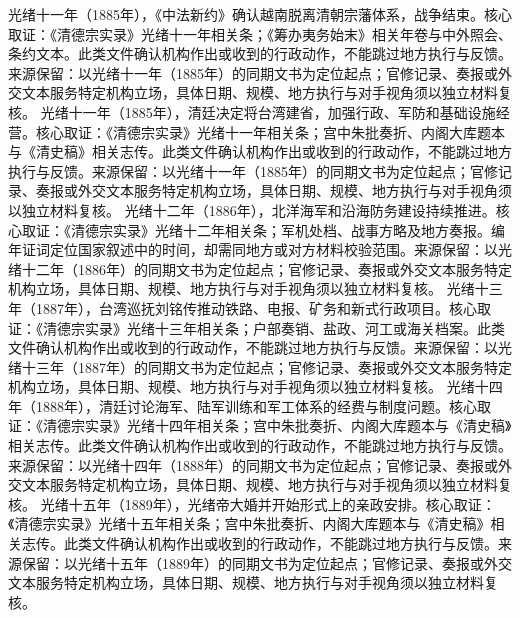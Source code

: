 光绪十一年（1885年），《中法新约》确认越南脱离清朝宗藩体系，战争结束。核心取证：《清德宗实录》光绪十一年相关条；《筹办夷务始末》相关年卷与中外照会、条约文本。此类文件确认机构作出或收到的行政动作，不能跳过地方执行与反馈。来源保留：以光绪十一年（1885年）的同期文书为定位起点；官修记录、奏报或外交文本服务特定机构立场，具体日期、规模、地方执行与对手视角须以独立材料复核。
光绪十一年（1885年），清廷决定将台湾建省，加强行政、军防和基础设施经营。核心取证：《清德宗实录》光绪十一年相关条；宫中朱批奏折、内阁大库题本与《清史稿》相关志传。此类文件确认机构作出或收到的行政动作，不能跳过地方执行与反馈。来源保留：以光绪十一年（1885年）的同期文书为定位起点；官修记录、奏报或外交文本服务特定机构立场，具体日期、规模、地方执行与对手视角须以独立材料复核。
光绪十二年（1886年），北洋海军和沿海防务建设持续推进。核心取证：《清德宗实录》光绪十二年相关条；军机处档、战事方略及地方奏报。编年证词定位国家叙述中的时间，却需同地方或对方材料校验范围。来源保留：以光绪十二年（1886年）的同期文书为定位起点；官修记录、奏报或外交文本服务特定机构立场，具体日期、规模、地方执行与对手视角须以独立材料复核。
光绪十三年（1887年），台湾巡抚刘铭传推动铁路、电报、矿务和新式行政项目。核心取证：《清德宗实录》光绪十三年相关条；户部奏销、盐政、河工或海关档案。此类文件确认机构作出或收到的行政动作，不能跳过地方执行与反馈。来源保留：以光绪十三年（1887年）的同期文书为定位起点；官修记录、奏报或外交文本服务特定机构立场，具体日期、规模、地方执行与对手视角须以独立材料复核。
光绪十四年（1888年），清廷讨论海军、陆军训练和军工体系的经费与制度问题。核心取证：《清德宗实录》光绪十四年相关条；宫中朱批奏折、内阁大库题本与《清史稿》相关志传。此类文件确认机构作出或收到的行政动作，不能跳过地方执行与反馈。来源保留：以光绪十四年（1888年）的同期文书为定位起点；官修记录、奏报或外交文本服务特定机构立场，具体日期、规模、地方执行与对手视角须以独立材料复核。
光绪十五年（1889年），光绪帝大婚并开始形式上的亲政安排。核心取证：《清德宗实录》光绪十五年相关条；宫中朱批奏折、内阁大库题本与《清史稿》相关志传。此类文件确认机构作出或收到的行政动作，不能跳过地方执行与反馈。来源保留：以光绪十五年（1889年）的同期文书为定位起点；官修记录、奏报或外交文本服务特定机构立场，具体日期、规模、地方执行与对手视角须以独立材料复核。
